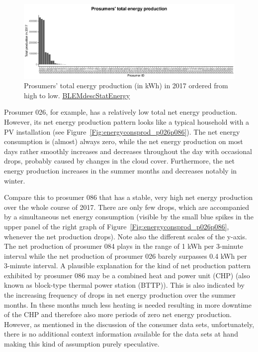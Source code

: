 \begin{figure}[htbp]
 \centering
\includegraphics[width=\textwidth]{thesis/graphs/prosumer_totalproduction2.pdf}
\caption[Prosumers’ total energy production (in kWh) in 2017]{Prosumers’ total energy production (in kWh) in 2017 ordered from high to low. \quantnet\href{ }{BLEMdescStatEnergy}}
\label{Fig:pros_total_production}
\end{figure}

Prosumer 026, for example, has a relatively low total net energy production. However, its net energy production pattern looks like a typical household with a PV installation (see Figure~\ref{Fig:energyconsprod_p026p086}). The net energy consumption is (almost) always zero, while the net energy production on most days rather smoothly increases and decreases throughout the day with occasional drops, probably caused by changes in the cloud cover. Furthermore, the net energy production increases in the summer months and decreases notably in winter.

Compare this to prosumer 086 that has a stable, very high net energy production over the whole course of 2017. There are only few drops, which are accompanied by a simultaneous net energy consumption (visible by the small blue spikes in the upper panel of the right graph of Figure~\ref{Fig:energyconsprod_p026p086}, whenever the net production drops). Note also the different scales of the y-axis. The net production of prosumer 084 plays in the range of 1 kWh per 3-minute interval while the net production of prosumer 026 barely surpasses 0.4 kWh per 3-minute interval. A plausible explanation for the kind of net production pattern exhibited by prosumer 086 may be a combined heat and power unit (CHP) (also known as block-type thermal power station (BTTP)). This is also indicated by the increasing frequency of drops in net energy production over the summer months. In these months much less heating is needed resulting in more downtime of the CHP and therefore also more periods of zero net energy production. However, as mentioned in the discussion of the consumer data sets, unfortunately, there is no additional context information available for the data sets at hand making this kind of assumption purely speculative.

